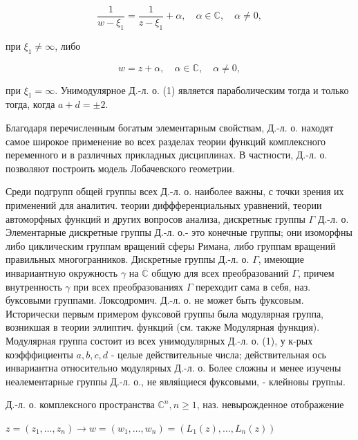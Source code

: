 \documentclass[10pt]{article}
\begin{document}
\[

\frac{1}{w-\xi_{1}}=\frac{1}{z-\xi_{1}}+\alpha, \quad \alpha \in \mathbb{C}, \quad \alpha \neq 0,

\]



при $\xi_{1} \neq \infty$, либо



\[

w=z+\alpha, \quad \alpha \in \mathbb{C}, \quad \alpha \neq 0,

\]



при $\xi_{1}=\infty$. Унимодулярное Д.-л. о. (1) является параболическим тогда и только тогда, когда $a+d= \pm 2$.



Благодаря перечисленным богатым элементарным свойствам, Д.-л. о. находят самое широкое применение во всех разделах теории функций комплексного переменного и в различных прикладных дисциплинах. В частности, Д.-л. о. позволяют построить модель Лобачевского геометрии.



Среди подгрупп общей группы всех Д.-л. о. наиболее важны, с точки зрения их применений для аналитич. теории диффференциальных уравнений, теории автоморфных функций и других вопросов анализа, дискретныє группы $\Gamma$ Д.-л. о. Элементарные дискретные группы Д.-л. о.- это конечные группы; они изоморфны либо циклическим группам вращений сферы Римана, либо группам вращений правильных многогранников. Дискретные группы Д.-л. о. $\Gamma$, имеющие инвариантную окружность $\gamma$ на $\overline{\mathbb{C}}$ общую для всех преобразований $\Gamma$, причем внутренность $\gamma$ при всех преобразованиях $\Gamma$ переходит сама в себя, наз. буксовыми группами. Локсодромич. Д.-л. о. не может быть фуксовым. Исторически первым примером фуксовой группы была модулярная группа, возникшая в теории эллиптич. функций (см. также Модулярная функция). Модулярная группа состоит из всех унимодулярных Д.-л. о. (1), у к-рых коэфффициенты $a, b, c, d$ - целые действительные числа; действительная ось инвариантна относительно модулярных Д.-л. о. Более сложны и менее изучены неәлементарные группы Д.-л. о., не являіщиеся фуксовыми, - клейновы групnы.



Д.-л. о. комплексного пространства $\mathbb{C}^{n}, n \geqslant 1$, наз. невырожденное отображение



$z=\left(z_{1}, \ldots, z_{n}\right) \longrightarrow w=\left(w_{1}, \ldots, w_{n}\right)=\left(L_{1}(z), \ldots, L_{n}(z)\right)$
\end{document}
